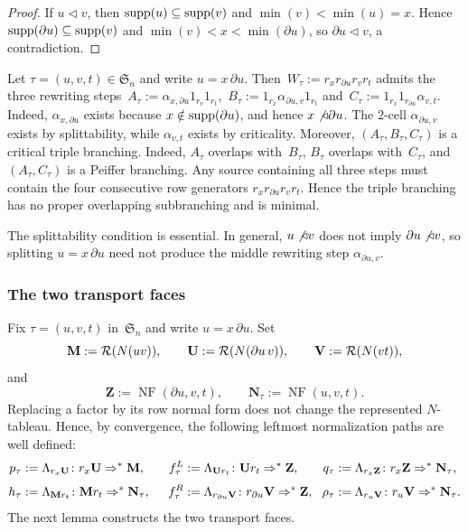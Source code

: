\documentclass[a4paper, twoside, 11pt, english]{article}
\newcommand{\npath}[1]{\Lambda_{#1}}
\begin{document}
\begin{proof}
If $u\triangleleft v$, then $\operatorname{supp}(u)\subseteq\operatorname{supp}(v)$ and
$\min(v)<\min(u)=x$. Hence $\operatorname{supp}(\partial u)\subseteq\operatorname{supp}(v)$ and
$\min(v)<x<\min(\partial u)$, so $\partial u\triangleleft v$, a
contradiction.
\end{proof}

Let $\tau=(u,v,t)\in\mathfrak S_n$ and write $u=x\,\partial u$. Then~$W_\tau:=r_xr_{\partial u}r_vr_t$
admits the three rewriting steps~$
A_\tau:=\alpha_{x,\partial u}1_{r_v}1_{r_t}$,~$
B_\tau:=1_{r_x}\alpha_{\partial u,v}1_{r_t}$ and~$
C_\tau:=1_{r_x}1_{r_{\partial u}}\alpha_{v,t}$.
Indeed, $\alpha_{x,\partial u}$ exists because
$x\notin\operatorname{supp}(\partial u)$, and hence
$x\not\triangleleft\partial u$.
The $2$-cell $\alpha_{\partial u,v}$ exists by splittability, while
$\alpha_{v,t}$ exists by criticality.
Moreover, $(A_\tau,B_\tau,C_\tau)$ is a critical triple branching.
Indeed, $A_\tau$ overlaps with~$B_\tau$, $B_\tau$ overlaps
with~$C_\tau$, and~$(A_\tau,C_\tau)$ is a Peiffer branching. Any source
containing all three steps must contain the four consecutive row generators
$r_xr_{\partial u}r_vr_t$. Hence the triple branching has no proper
overlapping subbranching and is minimal.


\begin{remark}
The splittability condition is essential. In general,
$u\not\triangleleft v$ does not imply
$\partial u\not\triangleleft v$, so splitting $u=x\,\partial u$ need not
produce the middle rewriting step $\alpha_{\partial u,v}$.
\end{remark}




\subsubsection{The two transport faces}

Fix $\tau=(u,v,t)$ in~$\mathfrak S_n$ and write
$u=x\,\partial u$. Set
\[
\mathbf M:=\mathcal{R}(N(uv)),
\qquad
\mathbf U:=\mathcal{R}(N(\partial u\,v)),
\qquad
\mathbf V:=\mathcal{R}(N(vt)),
\]
and
\[
\mathbf Z:=\operatorname{NF}(\partial u,v,t),
\qquad
\mathbf N_\tau:=\operatorname{NF}(u,v,t).
\]
Replacing a factor by its row normal form does not change the represented
$N$-tableau. Hence, by convergence, the following leftmost normalization
paths are well defined:
\[
\begin{alignedat}{3}
p_\tau
&:=
\npath{r_x\mathbf U}
\colon r_x\mathbf U\dfl^*\mathbf M,
\qquad&
f_\tau^L
&:=
\npath{\mathbf U r_t}
\colon \mathbf U r_t\dfl^*\mathbf Z,
\qquad&
q_\tau
&:=
\npath{r_x\mathbf Z}
\colon r_x\mathbf Z\dfl^*\mathbf N_\tau,
\\[1mm]
h_\tau
&:=
\npath{\mathbf M r_t}
\colon \mathbf M r_t\dfl^*\mathbf N_\tau,
&
f_\tau^R
&:=
\npath{r_{\partial u}\mathbf V}
\colon r_{\partial u}\mathbf V\dfl^*\mathbf Z,
&
\rho_\tau
&:=
\npath{r_u\mathbf V}
\colon r_u\mathbf V\dfl^*\mathbf N_\tau.
\end{alignedat}
\]
The next lemma constructs the two transport faces.
\end{document}

